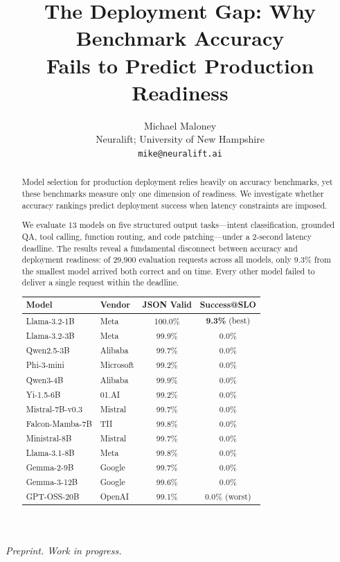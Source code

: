 \documentclass[11pt]{article}
\title{The Deployment Gap: Why Benchmark Accuracy\\Fails to Predict Production Readiness}
\author{
Michael Maloney \\
Neuralift; University of New Hampshire \\
\texttt{mike@neuralift.ai}
}
\date{}
\begin{document}
\maketitle
\begin{center}
\textit{Preprint. Work in progress.}
\end{center}

\begin{abstract}
Model selection for production deployment relies heavily on accuracy benchmarks, yet these benchmarks measure only one dimension of readiness. We investigate whether accuracy rankings predict deployment success when latency constraints are imposed.

We evaluate 13 models on five structured output tasks---intent classification, grounded QA, tool calling, function routing, and code patching---under a 2-second latency deadline. The results reveal a fundamental disconnect between accuracy and deployment readiness: of 29,900 evaluation requests across all models, only 9.3\% from the smallest model arrived both correct and on time. Every other model failed to deliver a single request within the deadline.

\begin{center}
\begin{tabular}{llcc}
\toprule
\textbf{Model} & \textbf{Vendor} & \textbf{JSON Valid} & \textbf{Success@SLO} \\
\midrule
Llama-3.2-1B & Meta & 100.0\% & \textbf{9.3\%} (best) \\
Llama-3.2-3B & Meta & 99.9\% & 0.0\% \\
Qwen2.5-3B & Alibaba & 99.7\% & 0.0\% \\
Phi-3-mini & Microsoft & 99.2\% & 0.0\% \\
Qwen3-4B & Alibaba & 99.9\% & 0.0\% \\
Yi-1.5-6B & 01.AI & 99.2\% & 0.0\% \\
Mistral-7B-v0.3 & Mistral & 99.7\% & 0.0\% \\
Falcon-Mamba-7B & TII & 99.8\% & 0.0\% \\
Ministral-8B & Mistral & 99.7\% & 0.0\% \\
Llama-3.1-8B & Meta & 99.8\% & 0.0\% \\
Gemma-2-9B & Google & 99.7\% & 0.0\% \\
Gemma-3-12B & Google & 99.6\% & 0.0\% \\
GPT-OSS-20B & OpenAI & 99.1\% & 0.0\% (worst) \\
\bottomrule
\end{tabular}
\end{center}


\end{abstract}
\end{document}
